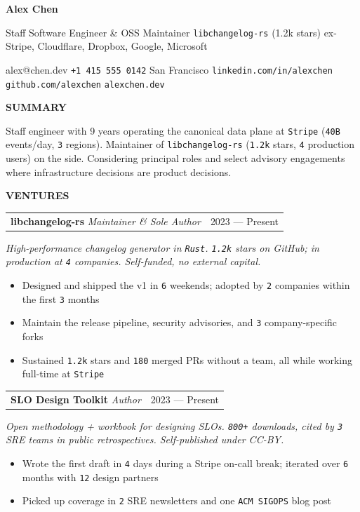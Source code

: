 \documentclass[letterpaper,9.5pt]{article}
\makeatletter
\newcommand{\fhead}[1]{%
  \vspace{10pt}
  {\bfseries\fontsize{10}{12}\selectfont\textcolor{fndrBody}{\MakeUppercase{#1}}}
  \vspace{4pt}
}
\newcommand{\fventure}[4]{%
  \vspace{2pt}
  \begin{tabularx}{\linewidth}{@{}Xr@{}}
    \textbf{#1} \textemdash{} \textit{#2} & \ttfamily\textcolor{fndrSec}{#3} \\
  \end{tabularx}
  \vspace{1pt}
  {\fontsize{10}{12}\selectfont\textit{#4}}
  \vspace{2pt}
}
\newcommand{\m}[1]{\texttt{\small #1}}
\makeatother
\begin{document}
{\bfseries\fontsize{24}{28}\selectfont\textcolor{fndrBody}{Alex Chen}}

\vspace{2pt}
{\fontsize{11}{14}\selectfont\textcolor{fndrBody}{Staff Software Engineer \& OSS Maintainer \textbullet{} \m{libchangelog-rs} (1.2k stars) \textbullet{} ex-Stripe, Cloudflare, Dropbox, Google, Microsoft}}

\vspace{8pt}
{\fontsize{10}{14}\selectfont\textcolor{fndrBody}{alex@chen.dev \textbullet{} \texttt{+1 415 555 0142} \textbullet{} San Francisco \textbullet{} \texttt{linkedin.com/in/alexchen} \textbullet{} \texttt{github.com/alexchen} \textbullet{} \texttt{alexchen.dev}}

\vspace{6pt}

\fhead{Summary}
Staff engineer with 9 years operating the canonical data plane at \m{Stripe} (\m{40B} events/day, \m{3} regions). Maintainer of \m{libchangelog-rs} (\m{1.2k} stars, \m{4} production users) on the side. Considering principal roles and select advisory engagements where infrastructure decisions are product decisions.

\fhead{Ventures}

\fventure{libchangelog-rs}{Maintainer \& Sole Author}{2023 --- Present}
{High-performance changelog generator in \m{Rust}. \m{1.2k} stars on GitHub; in production at \m{4} companies. Self-funded, no external capital.}

\begin{itemize}
  \item Designed and shipped the v1 in \m{6} weekends; adopted by \m{2} companies within the first \m{3} months
  \item Maintain the release pipeline, security advisories, and \m{3} company-specific forks
  \item Sustained \m{1.2k} stars and \m{180} merged PRs without a team, all while working full-time at \m{Stripe}
\end{itemize}

\vspace{4pt}
\fventure{SLO Design Toolkit}{Author}{2023 --- Present}
{Open methodology + workbook for designing SLOs. \m{800+} downloads, cited by \m{3} SRE teams in public retrospectives. Self-published under CC-BY.}

\begin{itemize}
  \item Wrote the first draft in \m{4} days during a Stripe on-call break; iterated over \m{6} months with \m{12} design partners
  \item Picked up coverage in \m{2} SRE newsletters and one \m{ACM SIGOPS} blog post
\end{itemize}

}
\end{document}
